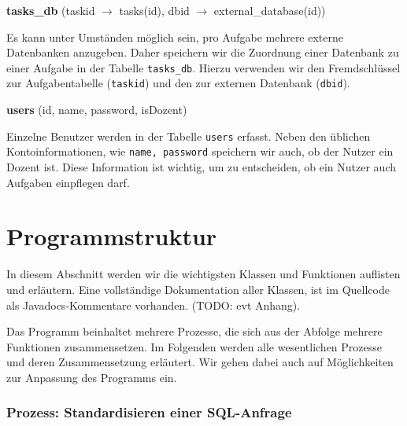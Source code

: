 \textbf{tasks\_db} (taskid $\to$ tasks(id), dbid $\to$ external\_database(id))

Es kann unter Umständen möglich sein, pro Aufgabe mehrere externe Datenbanken anzugeben. Daher speichern wir die Zuordnung einer Datenbank zu einer Aufgabe in der Tabelle \verb|tasks_db|. Hierzu verwenden wir den Fremdschlüssel zur Aufgabentabelle (\verb|taskid|) und den zur externen Datenbank (\verb|dbid|).

\textbf{users} (id, name, password, isDozent)

Einzelne Benutzer werden in der Tabelle \verb|users| erfasst. Neben den üblichen Kontoinformationen, wie \verb|name, password| speichern wir auch, ob der Nutzer ein Dozent ist. Diese Information ist wichtig, um zu entscheiden, ob ein Nutzer auch Aufgaben einpflegen darf.

\section{Programmstruktur}

In diesem Abschnitt werden wir die wichtigsten Klassen und Funktionen auflisten und erläutern. Eine vollständige Dokumentation aller Klassen, ist im Quellcode als Javadocs-Kommentare vorhanden. (TODO: evt Anhang).

Das Programm beinhaltet mehrere Prozesse, die sich aus der Abfolge mehrere Funktionen zusammensetzen. Im Folgenden werden alle wesentlichen Prozesse und deren Zusammensetzung erläutert. Wir gehen dabei auch auf Möglichkeiten zur Anpassung des Programms ein.

\subsubsection{Prozess: Standardisieren einer SQL-Anfrage} 

